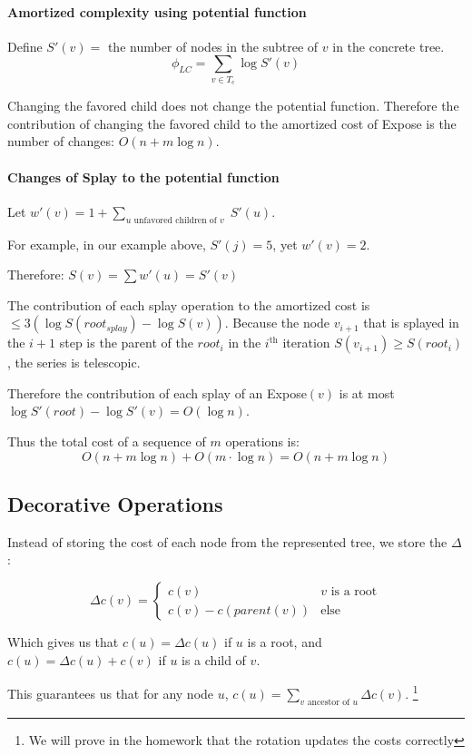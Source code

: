 \documentclass[a4paper]{article}
\begin{document}
\paragraph{Amortized complexity using potential function}
Define $S'(v)=$ the number of nodes in the subtree of $v$ in the concrete tree.
\[\phi_{LC}= \sum_{v \in T_\text{c}} \log S'(v)\]

Changing the favored child does not change the potential function.
Therefore the contribution of changing the favored child to the amortized cost of Expose is the number of changes: $O(n+m\log n)$.

\paragraph{Changes of Splay to the potential function}
Let $w'(v)=1+\sum_{u\text{ unfavored children of }v} \; S'(u)$.

For example, in our example above, $S'(j)=5$, yet $w'(v)=2$.

Therefore: $S(v)= \sum w'(u) = S'(v)$

The contribution of each splay operation to the amortized cost is $\le 3(\log S(root_{splay}) - \log S(v))$.
Because the node $v_{i+1}$ that is splayed in the $i+1$ step is the parent of the $root_i$ in the $i^{\text{th}}$ iteration $S(v_{i+1}) \ge S(root_i)$, the series is telescopic.

Therefore the contribution of each splay of an Expose$(v)$ is at most $\log S'(root) - \log S'(v) = O(\log n)$.

Thus the total cost of a sequence of $m$ operations is:
\[O(n+m\log n)+O(m\cdot \log n) = O(n+m\log n)\]

\subsection{Decorative Operations}
Instead of storing the cost of each node from the represented tree, we store the $\Delta$:

\[
\Delta c(v)=\begin{cases}
c(v) & v\text{ is a root} \\
c(v) - c(parent(v)) & \text{else}
\end{cases}
\]

Which gives us that $c(u)=\Delta c(u)$ if $u$ is a root, and $c(u)=\Delta c(u) + c(v)$ if $u$ is a child of $v$.

This guarantees us that for any node $u$, $c(u)=\sum_{v\text{ ancestor of }u}\Delta c(v)$.
\footnote{We will prove in the homework that the rotation updates the costs correctly}
\end{document}
